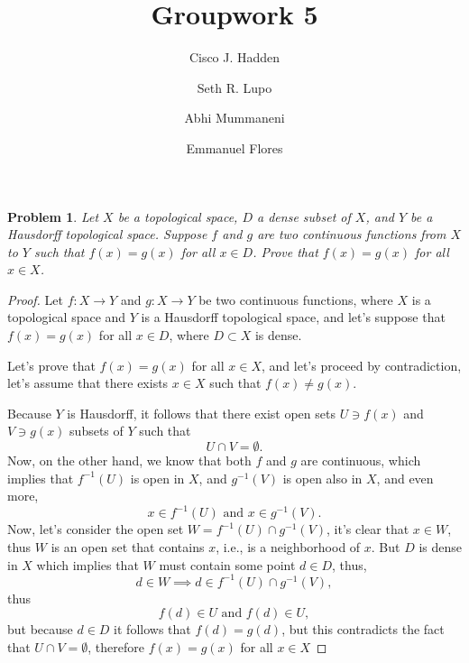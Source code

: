 \documentclass{article}
\title{Groupwork 5}
\author{Cisco J. Hadden
\and  Seth R. Lupo
\and Abhi Mummaneni
\and Emmanuel Flores}
\newtheorem{problem}{Problem}
\newtheorem{proof}{Proof}
\begin{document}
\maketitle
\begin{problem}
	Let $X$ be a topological space, $D$ a dense subset of $X$, and $Y$ be a Hausdorff topological space. Suppose $f$	and $g$ are two continuous functions from $X$ to $Y$ such that $f(x) = g(x)$ for all $x \in D$. Prove that $f(x) = g(x)$ for all $x \in X$.
\end{problem}	

\begin{proof}
Let $f: X \rightarrow Y$ and $g: X \rightarrow Y$ be two continuous functions, where $X$ is a topological space and $Y$ is a Hausdorff topological space, and let's suppose that $f(x) = g(x)$ for all $x\in D$, where $D\subset X$  is dense.

Let's prove that $f(x) = g(x)$ for all $x\in X$, and let's proceed by contradiction, let's assume that there exists $x \in X$ such that $f(x) \neq g(x)$. 

Because $Y$ is Hausdorff, it follows that there exist open sets $U\ni f(x) $ and $V \ni g(x)$ subsets of $Y$ such that
\begin{displaymath}
  U \cap V =\emptyset.
\end{displaymath}
Now, on the other hand, we know that both $f$ and $g$ are continuous, which implies that $f^{-1}(U)$ is open in $X$, and $  g^{-1}(V)$ is open also in $X$, and even more,
\begin{displaymath}
	x\in f^{-1}(U) \text{  and  } x\in g^{-1}(V).
\end{displaymath}
Now, let's consider the open set $W=f^{-1}(U)\cap g^{-1}(V)$, it's clear that $x \in W$, thus $W$ is an open set that contains $x$, i.e., is a neighborhood of $x$. But $D$ is dense in $X$ which implies that $W$ must contain some point $d \in D$, thus,
\begin{displaymath}
  d\in W \implies d\in f^{-1}(U)\cap g^{-1}(V),
\end{displaymath}
thus 
\begin{displaymath}
  f(d)\in U \text{ and } f(d)\in U,
\end{displaymath}
but because $d \in D$ it follows that $f(d)=g(d)$, but this contradicts the fact that $U\cap V=\emptyset$, therefore $f(x) = g(x)$ for all $x \in X$

\end{proof}
\end{document}
